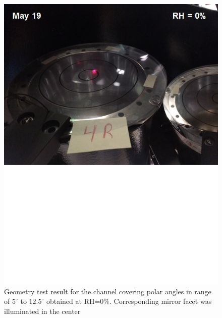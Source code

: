 \begin{figure}[h]
    \centering
    \includegraphics[width=1.0\linewidth,trim={0 8.5cm 0 0},clip]{images/GEO_TEST_4_Zero.jpg}
    \caption{Geometry test result for the channel covering polar angles in range of $5^\circ$ to $12.5^\circ$ obtained at RH=0\%. Corresponding mirror facet was illuminated in the center}
    \label{fig:GEO_TEST_4_Zero}
\end{figure}

